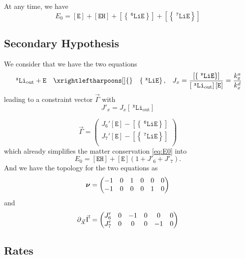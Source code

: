 \documentclass[aps,onecolumn,12pt]{revtex4}
\newcommand{\mychem}[1]{\mathtt{#1}}
\newcommand{\myconc}[1]{\left\lbrack{#1}\right\rbrack}
\newcommand{\spLi}[1]{{~^{\mychem{#1}}\mychem{Li}}}
\newcommand{\spEout}{\mychem{E}}
\newcommand{\Eout}{\myconc{\spEout}}
\newcommand{\spLiE}[1]{\left\lbrace\spLi{#1}\spEout\right\rbrace}
\newcommand{\LiE}[1]{\myconc{\spLiE{#1}}}
\newcommand{\spLiOut}[1]{{\spLi{#1}}_{\mathrm{out}}}
\newcommand{\LiOut}[1]{\myconc{\spLiOut{#1}}}
\newcommand{\spEHin}{\mychem{EH}}
\newcommand{\EHin}{\myconc{\spEHin}}
\newcommand{\mymat}[1]{{\bm{#1}}}
\begin{document}
At any time, we  have
\begin{equation} 
	\label{eq:E0}
	E_0 = \Eout + \EHin +  \LiE{6} + \LiE{7}
\end{equation}

\subsection{Secondary Hypothesis}
We consider that we have the two equations
\begin{equation}
	\begin{array}{rcll}
	 \spLiOut{x} +  \spEout &  \xrightleftharpoons[]{} & \spLiE{x}, & J_x = \dfrac{\LiE{x}}{\LiOut{x} \Eout} = \dfrac{k_x^a}{k_x^d}\\
	 \end{array}
\end{equation}
leading to a constraint vector $\vec{\Gamma}$
with 
\begin{equation}
	J'_x = J_x \LiOut{x}
\end{equation}

\begin{equation}
\vec{\Gamma} = 
\begin{pmatrix}
	J_6' \Eout - \LiE{6} \\
	J_7' \Eout - \LiE{7} \\
\end{pmatrix}
\end{equation}
which already simplifies the matter conservation \eqref{eq:E0} into
\begin{equation}
	E_0 = \EHin + \Eout \left(1+J'_6+J'_7\right).
\end{equation}
And we have the topology for the two equations as
\begin{equation}
	\label{eq:Nu}
	\mymat{\nu}=\begin{pmatrix}-1 & 0 & 1 & 0 & 0 & 0\cr -1 & 0 & 0 & 0 & 1 & 0\end{pmatrix}
\end{equation}
and
\begin{equation}
	\partial_{\vec{X}}\vec{\Gamma} = 
	\begin{pmatrix}J'_6 & 0 & -1 & 0 & 0 & 0\cr J'_7 & 0 & 0 & 0 & -1 & 0\end{pmatrix}
\end{equation}

\subsection{Rates}
\end{document}
